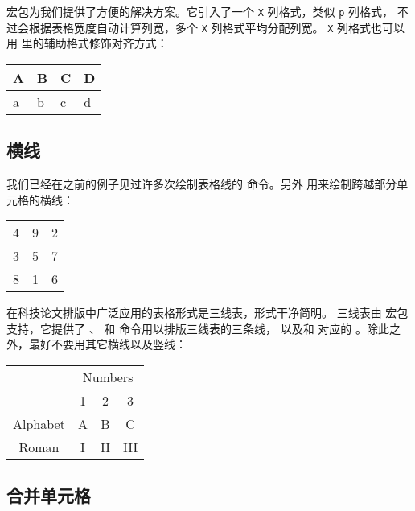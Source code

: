  宏包为我们提供了方便的解决方案。它引入了一个 \texttt{X} 列格式，类似 \texttt{p} 列格式，
不过会根据表格宽度自动计算列宽，多个 \texttt{X} 列格式平均分配列宽。
\texttt{X} 列格式也可以用  里的辅助格式修饰对齐方式：
\begin{example}
\begin{tabularx}{14em}%
{|*{4}{>{\centering\arraybackslash}X|}}
  \hline
  A & B & C & D \\ \hline
  a & b & c & d \\ \hline
\end{tabularx}
\end{example}

\subsection{横线}\label{subsec:hline}

我们已经在之前的例子见过许多次绘制表格线的  命令。另外  用来绘制跨越部分单元格的横线：
\begin{example}
\begin{tabular}{|c|c|c|}
  \hline
  4 & 9 & 2 \\ \cline{2-3}
  3 & 5 & 7 \\ \cline{1-1}
  8 & 1 & 6 \\ \hline
\end{tabular}
\end{example}

在科技论文排版中广泛应用的表格形式是三线表，形式干净简明。
三线表由  宏包支持，它提供了 、 和  命令用以排版三线表的三条线，
以及和  对应的 。除此之外，最好不要用其它横线以及竖线：
\begin{example}
\begin{tabular}{cccc}
  \toprule
   & \multicolumn{3}{c}{Numbers} \\
  \cmidrule{2-4}
           & 1 & 2 & 3 \\
  \midrule
  Alphabet & A & B & C \\
  Roman    & I & II& III \\
  \bottomrule
\end{tabular}
\end{example}

\subsection{合并单元格}\label{subsec:tabular-multicol}

